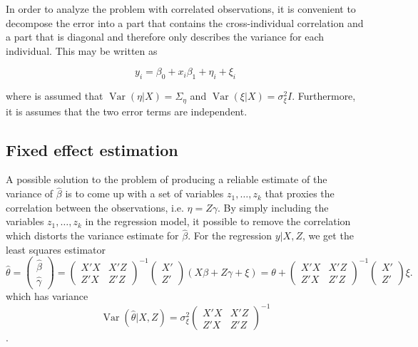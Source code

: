 \documentclass[final,leqno]{siamltex1213}
\DeclareMathOperator{\Var}{Var}
\begin{document}
In order to analyze the problem with correlated observations, it is convenient to decompose the error into a part that contains the cross-individual correlation and a part that is diagonal and therefore only describes the variance for each individual. This may be written as

\begin{equation*}
    y_i = \beta_0 + x_i\beta_1 + \eta_i + \xi_i
\end{equation*}

where is assumed that $\Var(\eta|X)=\Sigma_\eta$ and $\Var(\xi|X)=\sigma^2_\xi I$. Furthermore, it is assumes that the two error terms are independent.

\subsection{Fixed effect estimation}
A possible solution to the problem of producing a reliable estimate of the variance of $\hat{\beta}$ is to come up with a set of variables $z_1,\dots,z_k$ that proxies the correlation between the observations, i.e. $\eta=Z\gamma$. By simply including the variables $z_1,\dots,z_k$ in the regression model, it possible to remove the correlation which distorts the variance estimate for $\hat{\beta}$. For the regression $y|X,Z$, we get the least squares estimator
\begin{equation*}
    \hat{\theta} = \begin{pmatrix}\hat{\beta} \\ \hat{\gamma}\end{pmatrix} =
    \begin{pmatrix}
        X'X & X'Z \\ Z'X & Z'Z
    \end{pmatrix}^{-1}
    \begin{pmatrix}
        X' \\ Z'
    \end{pmatrix}
    (X\beta + Z\gamma + \xi)=
    \theta +
            \begin{pmatrix}
        X'X & X'Z \\ Z'X & Z'Z
    \end{pmatrix}^{-1}
    \begin{pmatrix}
        X' \\ Z'
    \end{pmatrix}\xi.
\end{equation*}
which has variance
\begin{equation*}
    \Var(\hat{\theta}|X,Z)=\sigma_\xi^2
        \begin{pmatrix} X'X & X'Z \\ Z'X & Z'Z \end{pmatrix}^{-1}
\end{equation*}.
\end{document}
